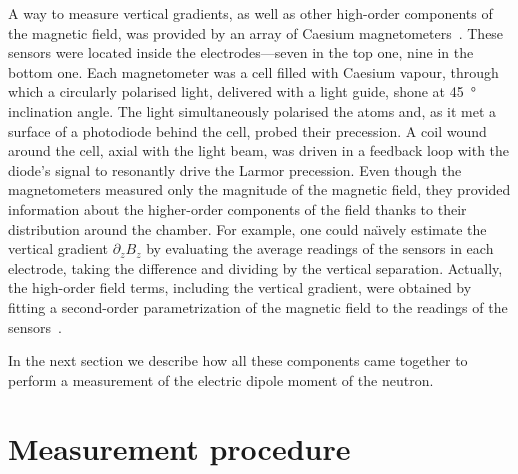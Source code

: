 A way to measure vertical gradients, as well as other high-order components of the magnetic field, was provided by an array of Caesium magnetometers~\cite{Groeger2005}. These sensors were located inside the electrodes---seven in the top one, nine in the bottom one. Each magnetometer was a cell filled with Caesium vapour, through which a circularly polarised light, delivered with a light guide, shone at \SI{45}{\degree} inclination angle. The light simultaneously polarised the atoms and, as it met a surface of a photodiode behind the cell, probed their precession. A coil wound around the cell, axial with the light beam, was driven in a feedback loop with the diode's signal to resonantly drive the Larmor precession. Even though the magnetometers measured only the magnitude of the magnetic field, they provided information about the higher-order components of the field thanks to their distribution around the chamber. For example, one could na\"\i vely estimate the vertical gradient $\partial_z B_z$ by evaluating the average readings of the sensors in each electrode, taking the difference and dividing by the vertical separation. Actually, the high-order field terms, including the vertical gradient, were obtained by fitting a second-order parametrization of the magnetic field to the readings of the sensors~\cite{WurstenThesis}.

In the next section we describe how all these components came together to perform a measurement of the electric dipole moment of the neutron.



\section{Measurement procedure}
\label{sec:measurement_procedure}

